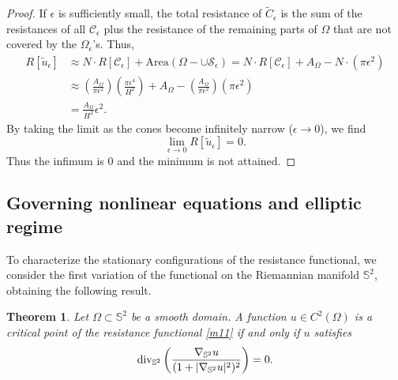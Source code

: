 \documentclass[a4paper,12pt]{amsart}
\theoremstyle{plain}
\newtheorem{theorem}{Theorem}[section]
\theoremstyle{definition}
\def\S{\mathcal S}
\begin{document}
\begin{proof}
If $\epsilon$ is sufficiently small, the total resistance of $\widetilde{C}_\epsilon$ is the sum of the resistances of all $\mathcal{C}_\epsilon$ plus the resistance of the remaining parts of $\Omega$ that are not covered by the $\Omega_\epsilon$'s. Thus, 
\begin{equation*}
\begin{split}
 R[\widetilde{u}_\epsilon]& \approx N\cdot R[\mathcal{C}_\epsilon]+\mbox{Area}(\Omega-\cup\S_\epsilon) = N\cdot R[\mathcal{C}_\epsilon]+A_\Omega-N\cdot(\pi\epsilon^2)\\
 & \approx \left( \frac{A_\Omega}{\pi \epsilon^2} \right) \left( \frac{\pi \epsilon^4}{H^2} \right)+A_\Omega -\left( \frac{A_\Omega}{\pi \epsilon^2} \right)(\pi\epsilon^2)\\
 &=  \frac{A_\Omega}{H^2}\epsilon^2.
\end{split}
\end{equation*}
 By taking the limit as the cones become infinitely narrow ($\epsilon\to 0$), we find
$$
 \lim_{\epsilon \to 0} R[\widetilde{u}_\epsilon] = 0.
$$
Thus the infimum is $0$ and the minimum is not attained.
\end{proof}
 
 \subsection{Governing nonlinear equations and elliptic regime}
To characterize the stationary configurations  of the resistance functional, we consider the first variation of the functional on the Riemannian manifold $\mathbb{S}^2$,  obtaining the following result.

\begin{theorem}
Let $\Omega \subset \mathbb{S}^2$ be a smooth domain. A function $u \in C^2(\Omega)$ is a critical point of the resistance functional \eqref{m11} if and only if $u$ satisfies 
\begin{equation} \label{el1}
 {\rm div}_{\mathbb{S}^2} \left( \frac{\nabla_{\mathbb{S}^2} u}{(1 + |\nabla_{\mathbb{S}^2} u|^2)^2} \right) = 0.
\end{equation}
\end{theorem}
\end{document}
